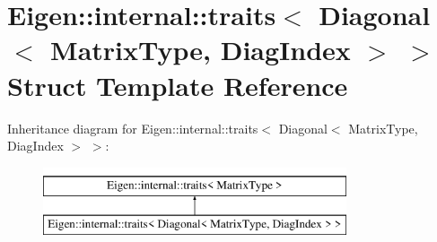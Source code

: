 \hypertarget{struct_eigen_1_1internal_1_1traits_3_01_diagonal_3_01_matrix_type_00_01_diag_index_01_4_01_4}{}\section{Eigen\+::internal\+::traits$<$ Diagonal$<$ Matrix\+Type, Diag\+Index $>$ $>$ Struct Template Reference}
\label{struct_eigen_1_1internal_1_1traits_3_01_diagonal_3_01_matrix_type_00_01_diag_index_01_4_01_4}
Inheritance diagram for Eigen\+::internal\+::traits$<$ Diagonal$<$ Matrix\+Type, Diag\+Index $>$ $>$\+:\begin{figure}[H]
\begin{center}
\leavevmode
\includegraphics[height=2.000000cm]{struct_eigen_1_1internal_1_1traits_3_01_diagonal_3_01_matrix_type_00_01_diag_index_01_4_01_4}
\end{center}
\end{figure}
